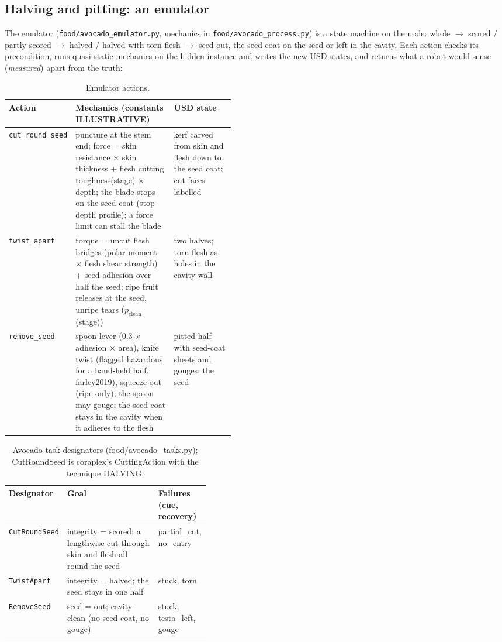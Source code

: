 \documentclass[10.5pt,a4paper]{article}
\begin{document}
\subsection{Halving and pitting: an emulator}
The emulator (\texttt{food/avocado\_emulator.py}, mechanics in \texttt{food/avocado\_process.py}) is a state machine
on the node: whole $\to$ scored / partly scored $\to$ halved / halved with torn flesh $\to$ seed out, the seed coat on
the seed or left in the cavity. Each action checks its precondition, runs quasi-static mechanics on the hidden
instance and writes the new USD states, and returns what a robot would sense (\emph{measured}) apart from the truth:
\begin{table}[htbp]\centering\scriptsize\caption{Emulator actions.}
\begin{tabularx}{\linewidth}{@{}p{0.18\linewidth}Xp{0.27\linewidth}@{}}\toprule Action & Mechanics (constants ILLUSTRATIVE) & USD state \\\midrule
\texttt{cut\_\allowbreak{}round\_\allowbreak{}seed} & puncture at the stem end; force = skin resistance $\times$ skin thickness + flesh cutting toughness(stage) $\times$ depth; the blade stops on the seed coat (stop-depth profile); a force limit can stall the blade & kerf carved from skin and flesh down to the seed coat; cut faces labelled \\
\texttt{twist\_\allowbreak{}apart} & torque = uncut flesh bridges (polar moment $\times$ flesh shear strength) + seed adhesion over half the seed; ripe fruit releases at the seed, unripe tears ($p_\text{clean}$(stage)) & two halves; torn flesh as holes in the cavity wall \\
\texttt{remove\_\allowbreak{}seed} & spoon lever (0.3 $\times$ adhesion $\times$ area), knife twist (flagged hazardous for a hand-held half, farley2019), squeeze-out (ripe only); the spoon may gouge; the seed coat stays in the cavity when it adheres to the flesh & pitted half with seed-coat sheets and gouges; the seed \\\bottomrule\end{tabularx}\end{table}
\begin{table}[htbp]\centering\scriptsize\caption{Avocado task designators (food/avocado\_tasks.py); CutRoundSeed is coraplex's CuttingAction with the technique HALVING.}
\begin{tabularx}{\linewidth}{@{}p{0.15\linewidth}Xp{0.25\linewidth}@{}}\toprule Designator & Goal & Failures (cue, recovery) \\\midrule
\texttt{CutRoundSeed} & integrity = scored: a lengthwise cut through skin and flesh all round the seed & partial\_cut, no\_entry \\
\texttt{TwistApart} & integrity = halved; the seed stays in one half & stuck, torn \\
\texttt{RemoveSeed} & seed = out; cavity clean (no seed coat, no gouge) & stuck, testa\_left, gouge \\\bottomrule\end{tabularx}\end{table}
\end{document}
